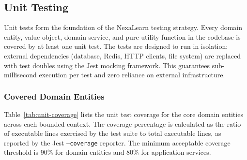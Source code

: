 
\subsection{Unit Testing}
\label{sec:unit-testing}

Unit tests form the foundation of the NexaLearn testing strategy. Every domain entity, value object, domain service, and pure utility function in the codebase is covered by at least one unit test. The tests are designed to run in isolation: external dependencies (database, Redis, HTTP clients, file system) are replaced with test doubles using the Jest mocking framework. This guarantees sub-millisecond execution per test and zero reliance on external infrastructure.

\subsubsection{Covered Domain Entities}

Table~\ref{tab:unit-coverage} lists the unit test coverage for the core domain entities across each bounded context. The coverage percentage is calculated as the ratio of executable lines exercised by the test suite to total executable lines, as reported by the Jest \texttt{--coverage} reporter. The minimum acceptable coverage threshold is 90\% for domain entities and 80\% for application services.

